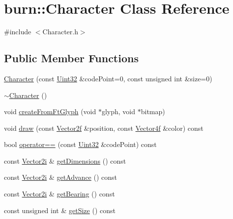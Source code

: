 \hypertarget{classburn_1_1_character}{\section{burn\-:\-:Character Class Reference}
\label{classburn_1_1_character}
}


{\ttfamily \#include $<$Character.\-h$>$}

\subsection*{Public Member Functions}
\begin{DoxyCompactItemize}
\item 
\hyperlink{classburn_1_1_character_a9972c2e356b95364c64db345e69b8d23}{Character} (const \hyperlink{namespaceburn_ab40b09022209bd449d317c1f0e95356b}{Uint32} \&code\-Point=0, const unsigned int \&size=0)
\item 
\hyperlink{classburn_1_1_character_af8b977dc4ed78f7b45b673e339dbf7f5}{$\sim$\-Character} ()
\item 
void \hyperlink{classburn_1_1_character_a1d87ddcf0eb04b4153b5903c46ce2486}{create\-From\-Ft\-Glyph} (void $\ast$glyph, void $\ast$bitmap)
\item 
void \hyperlink{classburn_1_1_character_a1b8e1666f241a5b9d36a6ecc4aa9c6e4}{draw} (const \hyperlink{namespaceburn_af5ed9eb70cbf0fb572098ff43e146a0a}{Vector2f} \&position, const \hyperlink{namespaceburn_a58a411b9d83c7970518a9250c1c78068}{Vector4f} \&color) const 
\item 
bool \hyperlink{classburn_1_1_character_ae2ed0524994d3bcf94d35a9fff1ae5de}{operator==} (const \hyperlink{namespaceburn_ab40b09022209bd449d317c1f0e95356b}{Uint32} \&code\-Point) const 
\item 
const \hyperlink{namespaceburn_afb9df6e019eb84491abb84140b4da64e}{Vector2i} \& \hyperlink{classburn_1_1_character_ae69a7fe121723228a12337a1f3cb843e}{get\-Dimensions} () const 
\item 
const \hyperlink{namespaceburn_afb9df6e019eb84491abb84140b4da64e}{Vector2i} \& \hyperlink{classburn_1_1_character_a7ca6a37f76970584f0f5f0679cc7f311}{get\-Advance} () const 
\item 
const \hyperlink{namespaceburn_afb9df6e019eb84491abb84140b4da64e}{Vector2i} \& \hyperlink{classburn_1_1_character_aa0bbf852aa8e2a496149303d46c5016a}{get\-Bearing} () const 
\item 
const unsigned int \& \hyperlink{classburn_1_1_character_a4f01f0bdfc24bda462b121c4763713fe}{get\-Size} () const 
\end{DoxyCompactItemize}


